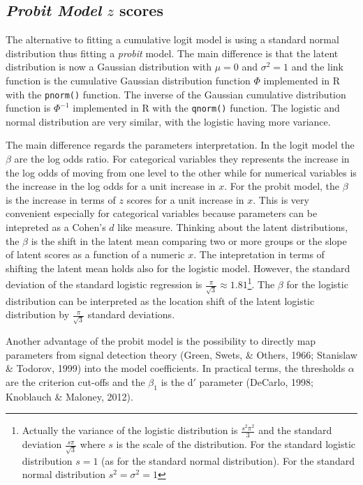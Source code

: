 \documentclass[
  man,floatsintext]{apa6}
\begin{document}
\normalsize

\subsection{\texorpdfstring{\emph{Probit Model} \(z\) scores}{Probit Model z scores}}\label{probit-model-z-scores}

The alternative to fitting a cumulative logit model is using a standard normal distribution thus fitting a \emph{probit} model. The main difference is that the latent distribution is now a Gaussian distribution with \(\mu = 0\) and \(\sigma^2 = 1\) and the link function is the cumulative Gaussian distribution function \(\Phi\) implemented in R with the \texttt{pnorm()} function. The inverse of the Gaussian cumulative distribution function is \(\Phi^{-1}\) implemented in R with the \texttt{qnorm()} function. The logistic and normal distribution are very similar, with the logistic having more variance.

The main difference regards the parameters interpretation. In the logit model the \(\beta\) are the log odds ratio. For categorical variables they represents the increase in the log odds of moving from one level to the other while for numerical variables is the increase in the log odds for a unit increase in \(x\). For the probit model, the \(\beta\) is the increase in terms of \(z\) scores for a unit increase in \(x\). This is very convenient especially for categorical variables because parameters can be intepreted as a Cohen's \(d\) like measure. Thinking about the latent distributions, the \(\beta\) is the shift in the latent mean comparing two or more groups or the slope of latent scores as a function of a numeric \(x\). The intepretation in terms of shifting the latent mean holds also for the logistic model. However, the standard deviation of the standard logistic regression is \(\frac{\pi}{\sqrt{3}} \approx 1.81\)\footnote{Actually the variance of the logistic distribution is \(\frac{s^2\pi^2}{3}\) and the standard deviation \(\frac{s\pi}{\sqrt{3}}\) where \(s\) is the scale of the distribution. For the standard logistic distribution \(s = 1\) (as for the standard normal distribution). For the standard normal distribution \(s^2 = \sigma^2 = 1\)}. The \(\beta\) for the logistic distribution can be interpreted as the location shift of the latent logistic distribution by \(\frac{\pi}{\sqrt{3}}\) standard deviations.

Another advantage of the probit model is the possibility to directly map parameters from signal detection theory (Green, Swets, \& Others, 1966; Stanislaw \& Todorov, 1999) into the model coefficients. In practical terms, the thresholds \(\alpha\) are the criterion cut-offs and the \(\beta_1\) is the d\('\) parameter (DeCarlo, 1998; Knoblauch \& Maloney, 2012).
\end{document}
